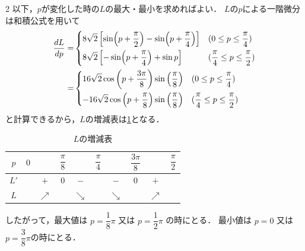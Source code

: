 \documentclass[../../main.tex]{subfiles}
\begin{document}
\begin{multicols}{2}
  以下，$p$が変化した時の$L$の最大・最小を求めればよい．
  $L$の$p$による一階微分は和積公式を用いて
  \begin{align}
    \dfrac{dL}{dp}=
    &
    \begin{dcases}
      8\sqrt{2}\left[\sin(p+\dfrac{\pi}{2}) -\sin(p+\dfrac{\pi}{4})\right] & (0 \le p \le \dfrac{\pi}{4})             \\
      8\sqrt{2}\left[-\sin(p+\dfrac{\pi}{4}) + \sin p\right]              & (\dfrac{\pi}{4} \le p \le \dfrac{\pi}{2})
    \end{dcases}      \\
    = &
    \begin{dcases}
      16\sqrt{2}\cos\left(p + \dfrac{3\pi}{8}\right)\sin\left(\dfrac{\pi}{8}\right) & (0 \le p \le \dfrac{\pi}{4})             \\
      -16\sqrt{2}\cos\left(p + \dfrac{\pi}{8}\right)\sin\left(\dfrac{\pi}{8}\right) & (\dfrac{\pi}{4} \le p \le \dfrac{\pi}{2})
    \end{dcases}
  \end{align}
  と計算できるから，$L$の増減表は\cref{1994-2:table:1}となる．
  \begin{table}[H]
    \centering
    \caption{$L$の増減表}
    \label{1994-2:table:1}
    \begin{tabular}{c||c|c|c|c|c|c|c|c|c|}
      $p$  & $0$ &            & $\dfrac{\pi}{8}$ &            & $\dfrac{\pi}{4}$ &            & $\dfrac{3\pi}{8}$ &            & $\dfrac{\pi}{2}$ \\
      \hline
      $L'$ &     & $+$        & $0$             & $-$        &                 & $-$        & $0$              & $+$        &                 \\
      \hline
      $L$  &     & $\nearrow$ &                 & $\searrow$ &                 & $\searrow$ &                  & $\nearrow$ &
    \end{tabular}
  \end{table}

  したがって，最大値は $p=\dfrac{1}{8}\pi$ 又は $p=\dfrac{1}{2}\pi$ の時にとる．
  最小値は $p=0$ 又は $p=\dfrac{3}{8}\pi$の時にとる．


\end{multicols}
\end{document}

